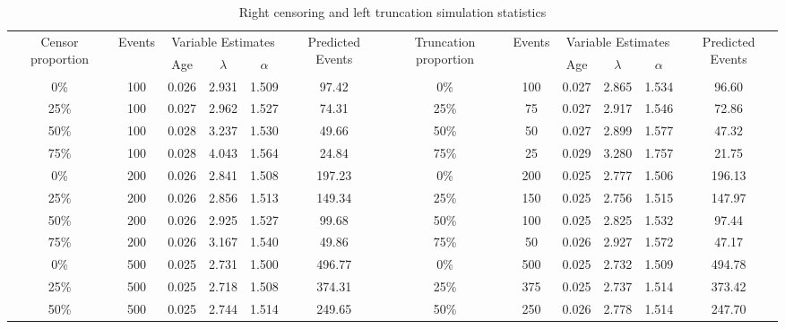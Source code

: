 \documentclass[12pt,letterpaper]{article}
\begin{document}
\begin{table}[htbp]
	\renewcommand{\arraystretch}{1.5}
	\scriptsize %
	\centering
	\caption{Right censoring and left truncation simulation statistics}
	
	\begin{tabular}{cccccc||cccccc}
		\hline
		\multicolumn{1}{c}{\multirow{2}{1.5cm}{Censor proportion}} & \multicolumn{1}{c}{\multirow{2}[3]{*}{Events}} & \multicolumn{3}{c}{Variable Estimates} & \multicolumn{1}{c}{\multirow{2}{1cm}{Predicted Events}} & \multicolumn{1}{c}{\multirow{2}{1.5cm}{Truncation proportion}} & \multicolumn{1}{c}{\multirow{2}[3]{*}{Events}} & \multicolumn{3}{c}{Variable Estimates} & \multicolumn{1}{c}{\multirow{2}{1cm}{Predicted Events}} \\
		\cline{3-5}
	    \cline{9-11}
		\multicolumn{1}{c}{} & \multicolumn{1}{c}{} & Age   & $\lambda$ & $\alpha$ & \multicolumn{1}{c}{} & \multicolumn{1}{c}{} & \multicolumn{1}{c}{} & Age   & $\lambda$ & $\alpha$ & \multicolumn{1}{c}{} \\
		\hline
				0\%   & 100   & 0.026 & 2.931 & 1.509 & 97.42 & 0\%   & 100 & 0.027 & 2.865 & 1.534 & 96.60 \\
				25\%  & 100    & 0.027 & 2.962 & 1.527 & 74.31 & 25\%  & 75 & 0.027 & 2.917 & 1.546 & 72.86 \\
				50\%  & 100    & 0.028 & 3.237 & 1.530 & 49.66 & 50\%  & 50 & 0.027 & 2.899 & 1.577 & 47.32 \\
				75\%  & 100    & 0.028 & 4.043 & 1.564 & 24.84 & 75\%  & 25 & 0.029 & 3.280 & 1.757 & 21.75 \\
				0\%   & 200   & 0.026 & 2.841 & 1.508 & 197.23 & 0\%   & 200 & 0.025 & 2.777 & 1.506 & 196.13 \\
				25\%  & 200   & 0.026 & 2.856 & 1.513 & 149.34 & 25\%  & 150   & 0.025 & 2.756 & 1.515 & 147.97 \\
				50\%  & 200   & 0.026 & 2.925 & 1.527 & 99.68 & 50\%  & 100   & 0.025 & 2.825 & 1.532 & 97.44 \\
				75\%  & 200    & 0.026 & 3.167 & 1.540 & 49.86 & 75\%  & 50    & 0.026 & 2.927 & 1.572 & 47.17 \\
				0\%   & 500   & 0.025 & 2.731 & 1.500 & 496.77 & 0\%   & 500 & 0.025 & 2.732 & 1.509 & 494.78 \\
				25\%  & 500   & 0.025 & 2.718 & 1.508 & 374.31 & 25\%  & 375 & 0.025 & 2.737 & 1.514 & 373.42 \\
				50\%  & 500   & 0.025 & 2.744 & 1.514 & 249.65 & 50\%  & 250 & 0.026 & 2.778 & 1.514 & 247.70 \\

\end{tabular}
\end{table}
\end{document}
